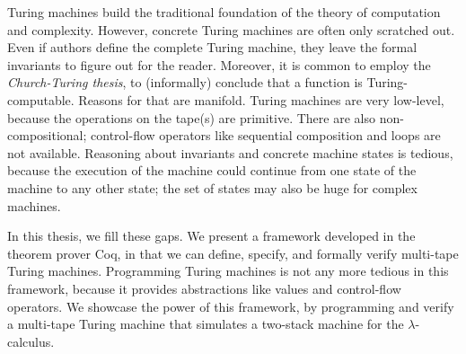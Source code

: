 Turing machines build the traditional foundation of the theory of computation and complexity.  However, concrete Turing machines are often only
scratched out.  Even if authors define the complete Turing machine, they leave the formal invariants to figure out for the reader.  Moreover, it is
common to employ the \textit{Church-Turing thesis}, to (informally) conclude that a function is Turing-computable.  Reasons for that are manifold.
Turing machines are very low-level, because the operations on the tape(s) are primitive.  There are also non-compositional; control-flow operators
like sequential composition and loops are not available.  Reasoning about invariants and concrete machine states is tedious, because the execution of
the machine could continue from one state of the machine to any other state; the set of states may also be huge for complex machines.

In this thesis, we fill these gaps.  We present a framework developed in the theorem prover Coq, in that we can define, specify, and formally verify
multi-tape Turing machines.  Programming Turing machines is not any more tedious in this framework, because it provides abstractions like values and
control-flow operators.  We showcase the power of this framework, by programming and verify a multi-tape Turing machine that simulates a two-stack
machine for the $\lambda$-calculus.


